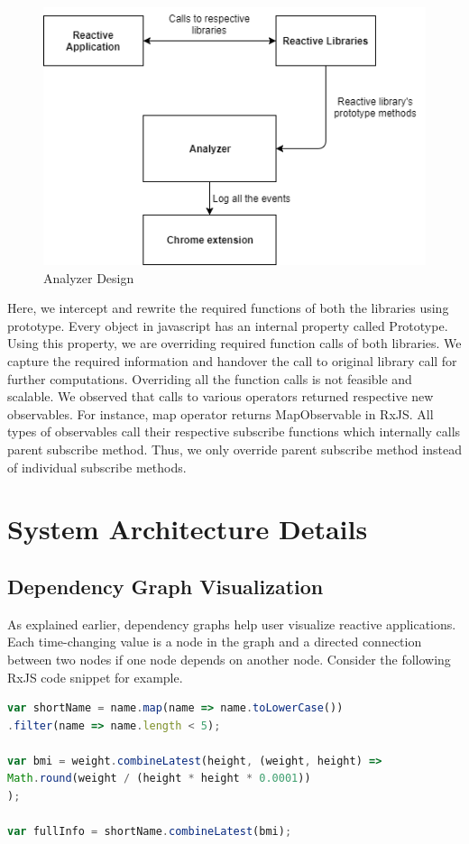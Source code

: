 \begin{figure}[!h]
	\centering
	\includegraphics[scale=0.5,trim=0 0 0 0]{images/analyzer-design.png}
	\caption{Analyzer Design}
	\label{fig:analyzer-design}
\end{figure}

Here, we intercept and rewrite the required functions of both the libraries using prototype\cite{prototype}. Every object in javascript has an internal property called Prototype. Using this property, we are overriding required function calls of both libraries. We capture the required information and handover the call to original library call for further computations. Overriding all the function calls is not feasible and scalable. We observed that calls to various operators returned respective new observables. For instance, map operator returns MapObservable in RxJS. All types of observables call their respective subscribe functions which internally calls parent subscribe method. Thus, we only override parent subscribe method instead of individual subscribe methods. 

\section{System Architecture Details}
\subsection{Dependency Graph Visualization}
As explained earlier, dependency graphs help user visualize reactive applications. Each time-changing value is a node in the graph and a directed connection between two nodes if one node depends on another node. Consider the following RxJS code snippet for example. 
\begin{lstlisting}[language=JavaScript, caption=RxJS code example, label={lst:rxjs-code-example}]
var shortName = name.map(name => name.toLowerCase())
.filter(name => name.length < 5);

var bmi = weight.combineLatest(height, (weight, height) =>
Math.round(weight / (height * height * 0.0001))
);

var fullInfo = shortName.combineLatest(bmi);
\end{lstlisting}

